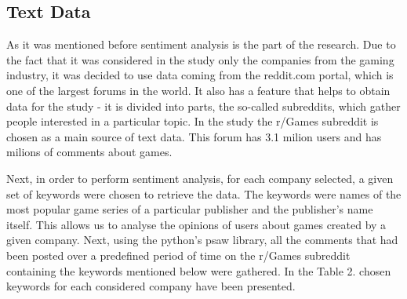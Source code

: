 \documentclass[11pt]{article} %
\begin{document}
\subsection{Text Data}
As it was mentioned before sentiment analysis is the part of the research. Due to the fact that it was considered in the study only the companies from the gaming industry, it was decided to use data coming from the reddit.com portal, which is one of the largest forums in the world. It also has a feature that helps to obtain data for the study - it is divided into parts, the so-called subreddits, which gather people interested in a particular topic. In the study the r/Games subreddit is chosen as a main source of text data. This forum has 3.1 milion users and has milions of comments about games. 

Next, in order to perform sentiment analysis, for each company selected, a given set of keywords were chosen to retrieve the data. The keywords were names of the most popular game series of a particular publisher and the publisher's name itself. This allows us to analyse the opinions of users about games created by a given company. Next, using the python's psaw library,  all the comments that had been posted over a predefined period of time on the r/Games subreddit containing the keywords mentioned below were gathered. In the Table 2. chosen keywords for each considered company have been presented. 
\end{document}
